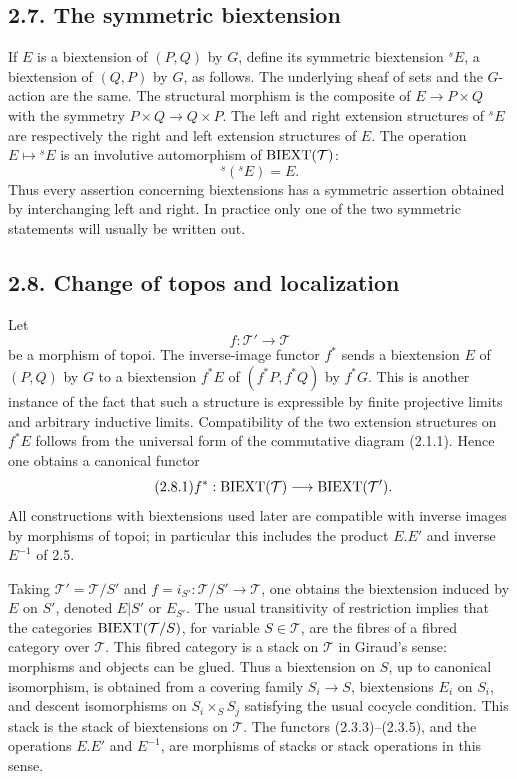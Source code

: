 \documentclass[11pt]{article}
\begin{document}
\subsection*{2.7. The symmetric biextension}
If \(E\) is a biextension of \((P,Q)\) by \(G\), define its symmetric biextension \({}^sE\), a biextension of \((Q,P)\) by \(G\), as follows.  The underlying sheaf of sets and the \(G\)-action are the same.  The structural morphism is the composite of \(E\to P\times Q\) with the symmetry \(P\times Q\to Q\times P\).  The left and right extension structures of \({}^sE\) are respectively the right and left extension structures of \(E\).  The operation \(E\mapsto{}^sE\) is an involutive automorphism of \(\operatorname{BIEXT}(\mathcal T)\):
\begin{equation}\tag{2.7.1}
  {}^s({}^sE)=E.
\end{equation}
Thus every assertion concerning biextensions has a symmetric assertion obtained by interchanging left and right.  In practice only one of the two symmetric statements will usually be written out.

\subsection*{2.8. Change of topos and localization}
Let
\begin{equation}\tag{2.8.0}
  f:\mathcal T'\longrightarrow\mathcal T
\end{equation}
be a morphism of topoi.  The inverse-image functor \(f^*\) sends a biextension \(E\) of \((P,Q)\) by \(G\) to a biextension \(f^*E\) of \((f^*P,f^*Q)\) by \(f^*G\).  This is another instance of the fact that such a structure is expressible by finite projective limits and arbitrary inductive limits.  Compatibility of the two extension structures on \(f^*E\) follows from the universal form of the commutative diagram (2.1.1).  Hence one obtains a canonical functor
\begin{equation}\tag{2.8.1}
  f^*:\operatorname{BIEXT}(\mathcal T)\longrightarrow\operatorname{BIEXT}(\mathcal T').
\end{equation}
All constructions with biextensions used later are compatible with inverse images by morphisms of topoi; in particular this includes the product \(E.E'\) and inverse \(E^{-1}\) of 2.5.

Taking \(\mathcal T'=\mathcal T/S'\) and \(f=i_{S'}:\mathcal T/S'\to\mathcal T\), one obtains the biextension induced by \(E\) on \(S'\), denoted \(E|S'\) or \(E_{S'}\).  The usual transitivity of restriction implies that the categories \(\operatorname{BIEXT}(\mathcal T/S)\), for variable \(S\in\mathcal T\), are the fibres of a fibred category over \(\mathcal T\).  This fibred category is a stack on \(\mathcal T\) in Giraud's sense: morphisms and objects can be glued.  Thus a biextension on \(S\), up to canonical isomorphism, is obtained from a covering family \(S_i\to S\), biextensions \(E_i\) on \(S_i\), and descent isomorphisms on \(S_i\times_SS_j\) satisfying the usual cocycle condition.  This stack is the stack of biextensions on \(\mathcal T\).  The functors (2.3.3)--(2.3.5), and the operations \(E.E'\) and \(E^{-1}\), are morphisms of stacks or stack operations in this sense.
\end{document}
